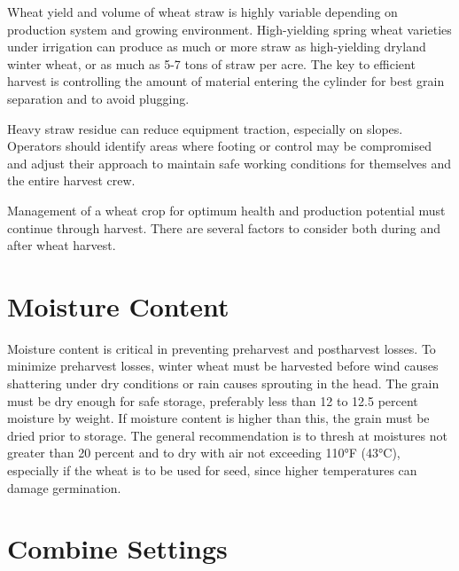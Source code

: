\documentclass[
  letterpaper,
  DIV=11,
  numbers=noendperiod]{scrreprt}
\begin{document}
Wheat yield and volume of wheat straw is highly variable depending on
production system and growing environment. High-yielding spring wheat
varieties under irrigation can produce as much or more straw as
high-yielding dryland winter wheat, or as much as 5-7 tons of straw per
acre. The key to efficient harvest is controlling the amount of material
entering the cylinder for best grain separation and to avoid plugging.

\begin{tcolorbox}[enhanced jigsaw, bottomrule=.15mm, opacityback=0, colback=white, left=2mm, titlerule=0mm, breakable, colframe=quarto-callout-tip-color-frame, colbacktitle=quarto-callout-tip-color!10!white, toprule=.15mm, rightrule=.15mm, coltitle=black, title=\textcolor{quarto-callout-tip-color}{\faLightbulb}\hspace{0.5em}{Harvest Safety Tip}, leftrule=.75mm, toptitle=1mm, bottomtitle=1mm, arc=.35mm, opacitybacktitle=0.6]

Heavy straw residue can reduce equipment traction, especially on slopes.
Operators should identify areas where footing or control may be
compromised and adjust their approach to maintain safe working
conditions for themselves and the entire harvest crew.

\end{tcolorbox}

Management of a wheat crop for optimum health and production potential
must continue through harvest. There are several factors to consider
both during and after wheat harvest.

\section{Moisture Content}\label{moisture-content}

Moisture content is critical in preventing preharvest and postharvest
losses. To minimize preharvest losses, winter wheat must be harvested
before wind causes shattering under dry conditions or rain causes
sprouting in the head. The grain must be dry enough for safe storage,
preferably less than 12 to 12.5 percent moisture by weight. If moisture
content is higher than this, the grain must be dried prior to storage.
The general recommendation is to thresh at moistures not greater than 20
percent and to dry with air not exceeding 110°F (43°C), especially if
the wheat is to be used for seed, since higher temperatures can damage
germination.

\section{Combine Settings}\label{combine-settings}
\end{document}

